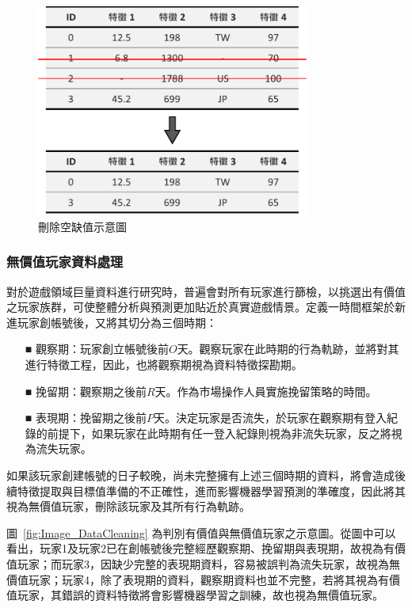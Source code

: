 \begin{figure}[!htb]
  \begin{center}
    \includegraphics[width=0.8\textwidth]{figures/Image_MissingValueHandle.png}
    \caption[刪除空缺值示意圖]{刪除空缺值示意圖}
    \label{fig:Image_MissingValueHandle}
  \end{center}
\end{figure}

\subsubsection{無價值玩家資料處理}
\label{subsubsec:NonValuePlayerHandle}

對於遊戲領域巨量資料進行研究時，普遍會對所有玩家進行篩檢，以挑選出有價值之玩家族群，可使整體分析與預測更加貼近於真實遊戲情景。定義一時間框架於新進玩家創帳號後，又將其切分為三個時期：

\begin{itemize}
  \item [■] 觀察期：玩家創立帳號後前$O$天。觀察玩家在此時期的行為軌跡，並將對其進行特徵工程，因此，也將觀察期視為資料特徵探勘期。
  \item [■] 挽留期：觀察期之後前$R$天。作為市場操作人員實施挽留策略的時間。
  \item [■] 表現期：挽留期之後前$P$天。決定玩家是否流失，於玩家在觀察期有登入紀錄的前提下，如果玩家在此時期有任一登入紀錄則視為非流失玩家，反之將視為流失玩家。
\end{itemize}

如果該玩家創建帳號的日子較晚，尚未完整擁有上述三個時期的資料，將會造成後續特徵提取與目標值準備的不正確性，進而影響機器學習預測的準確度，因此將其視為無價值玩家，刪除該玩家及其所有行為軌跡。

圖~\ref{fig:Image_DataCleaning} 為判別有價值與無價值玩家之示意圖。從圖中可以看出，玩家1及玩家2已在創帳號後完整經歷觀察期、挽留期與表現期，故視為有價值玩家；而玩家3，因缺少完整的表現期資料，容易被誤判為流失玩家，故視為無價值玩家；玩家4，除了表現期的資料，觀察期資料也並不完整，若將其視為有價值玩家，其錯誤的資料特徵將會影響機器學習之訓練，故也視為無價值玩家。

